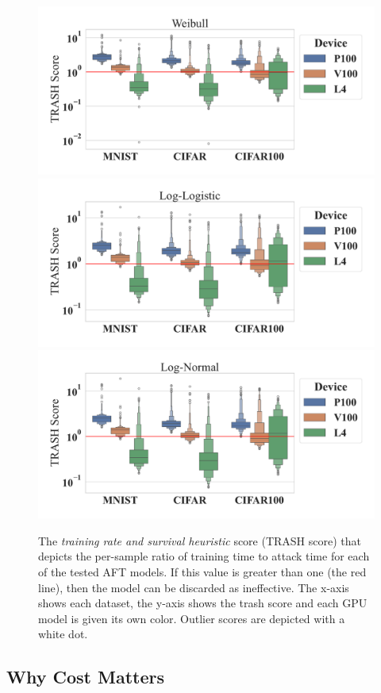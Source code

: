 \documentclass[sn-mathphys-num]{sn-jnl}%
\begin{document}
\begin{figure}[tph!]
    \centering
        \includegraphics[width=.49\linewidth]{plots/combined/weibull_trash_score.pdf}
        \includegraphics[width=.49\linewidth]{plots/combined/log_logistic_trash_score.pdf}
        \includegraphics[width=.49\linewidth]{plots/combined/log_normal_trash_score.pdf}
    \caption{The \textit{training rate and survival heuristic} score (TRASH score) that depicts the per-sample ratio of training time to attack time for each of the tested AFT models. 
    If this value is greater than one (the red line), then the model can be discarded as ineffective. The x-axis shows each dataset, the y-axis shows the \acrshort{trash} score and each GPU model is given its own color. Outlier scores are depicted with a white dot.}
    \label{fig:trash}
\end{figure}

\subsection{Why Cost Matters}
\end{document}

